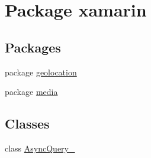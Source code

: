 \hypertarget{namespacexamarin}{\section{Package xamarin}
\label{namespacexamarin}
}
\subsection*{Packages}
\begin{DoxyCompactItemize}
\item 
package \hyperlink{namespacexamarin_1_1geolocation}{geolocation}
\item 
package \hyperlink{namespacexamarin_1_1media}{media}
\end{DoxyCompactItemize}
\subsection*{Classes}
\begin{DoxyCompactItemize}
\item 
class \hyperlink{classxamarin_1_1_async_query__1}{Async\+Query\+\_}
\end{DoxyCompactItemize}
